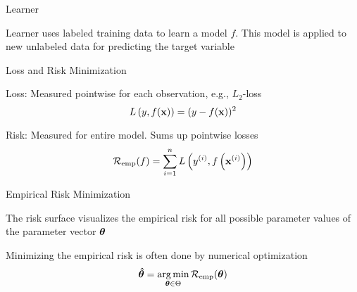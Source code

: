 \documentclass[11pt,compress,t,notes=noshow, xcolor=table]{beamer}
\begin{document}
\begin{framei}{Learner}
\item Learner uses labeled training data to learn a model $f$. This model is applied to new unlabeled data for predicting the target variable
\end{framei}


\begin{framei}{Loss and Risk Minimization}
\item Loss: Measured pointwise for each observation, e.g., $L_2$-loss
$$
L\left(y, f(\mathbf{x})\right) = (y - f(\mathbf{x}))^2
$$
\item Risk: Measured for entire model. Sums up pointwise losses
$$
\mathcal{R}_{\text{emp}}(f) = \sum\limits_{i=1}^n L\left(y^{(i)}, f\left(\mathbf{x}^{(i)}\right)\right)
$$
\vfill
{}
\end{framei}


\begin{framei}[fs=small]{Empirical Risk Minimization}
\item The risk surface visualizes the empirical risk for all possible parameter values of the parameter vector $\bm{\theta}$
\item Minimizing the empirical risk is often done by numerical optimization
$$
\bm{\hat\theta} = \mathop{\mathrm{arg\,min}}_{\bm{\theta} \in \Theta} \mathcal{R}_{\text{emp}}(\bm{\theta})
$$
\end{framei}

\endlecture
\end{document}
